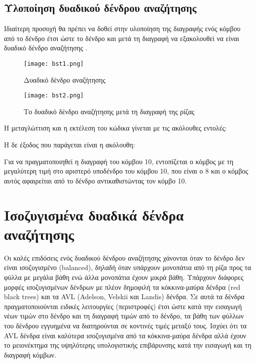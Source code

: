 \subsection{Υλοποίηση δυαδικού δένδρου αναζήτησης}

Ιδιαίτερη προσοχή θα πρέπει να δοθεί στην υλοποίηση της διαγραφής ενός κόμβου από το δένδρο έτσι ώστε το δένδρο και μετά τη διαγραφή να εξακολουθεί να είναι δυαδικό δένδρο αναζήτησης \cite{jumping_into_cpp}. 

\begin{figure}[!tbp]
  \centering
  \begin{minipage}[b]{0.4\textwidth}
    \texttt{[image: bst1.png]}
    \label{fig:bst1}
    \caption{Δυαδικό δένδρο αναζήτησης}
  \end{minipage}
  \hfill
  \begin{minipage}[b]{0.4\textwidth}
    \texttt{[image: bst2.png]}
    \label{fig:bst2}
    \caption{Το δυαδικό δένδρο αναζήτησης μετά τη διαγραφή της ρίζας}
  \end{minipage}
\end{figure}







Η μεταγλώττιση και η εκτέλεση του κώδικα γίνεται με τις ακόλουθες εντολές:



Η δε έξοδος που παράγεται είναι η ακόλουθη:



Για να πραγματοποιηθεί η διαγραφή του κόμβου 10, εντοπίζεται ο κόμβος με τη μεγαλύτερη τιμή στο αριστερό υποδένδρο του κόμβου 10, που είναι ο 8 και ο κόμβος αυτός αφαιρείται από το δένδρο αντικαθιστώντας τον κόμβο 10.

\section{Ισοζυγισμένα δυαδικά δένδρα αναζήτησης}
\label{bbst}

Οι καλές επιδόσεις ενός δυαδικού δένδρου αναζήτησης χάνονται όταν το δένδρο δεν είναι ισοζυγισμένο (balanced), δηλαδή όταν υπάρχουν μονοπάτια από τη ρίζα προς τα φύλλα με μεγάλα βάθη ενώ άλλα μονοπάτια έχουν μικρά βάθη. Υπάρχουν διάφορες μορφές ισοζυγισμένων δένδρων με πλέον δημοφιλή τα κόκκινα-μαύρα δένδρα (red black trees) και τα AVL (Adelson, Velskii και Landis) δένδρα. Σε αυτά τα δένδρα πραγματοποιούνται ειδικές λειτουργίες (περιστροφές) έτσι ώστε κατά την εισαγωγή νέων τιμών στο δένδρο και τη διαγραφή τιμών από το δένδρο, τα βάθη των φύλλων του δένδρου εγγυημένα να διατηρούνται σε κοντινές τιμές μεταξύ τους. Ισχύει ότι τα AVL δένδρα είναι καλύτερα ισοζυγισμένα από τα κόκκινα-μαύρα δένδρα αλλά έχουν το μειονέκτημα της υψηλότερης υπολογιστικής επιβάρυνσης κατά την εισαγωγή και τη διαγραφή κόμβων.

